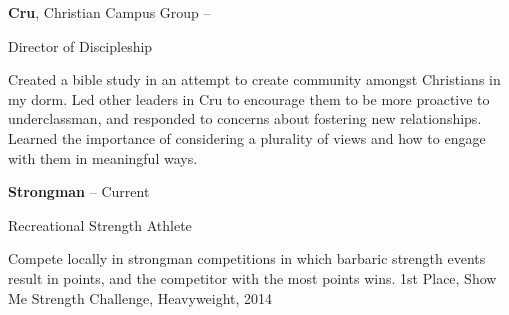 \documentclass[a4paper,10pt,oneside]{article}
\newcommand{\CVNote}{Resume Compiled on May 7}
\begin{document}
\begin{body}
\EntryGap
\textbf{Cru}, Christian Campus Group
\hfill
{} --
\par
Director of Discipleship
\begin{detail}
\BulletItem
Created a bible study in an attempt to create community amongst Christians in my dorm.
\BulletItem
Led other leaders in Cru to encourage them to be more proactive to underclassman, and responded to concerns about fostering new relationships.
\BulletItem
Learned the importance of considering a plurality of views and how to engage with them in meaningful ways.
\end{detail}

\EntryGap
\textbf{Strongman}
\hfill
{} -- Current
\par
Recreational Strength Athlete
\begin{detail}
\BulletItem
Compete locally in strongman competitions in which barbaric strength events result in points, and the competitor with the most points wins.
\BulletItem
1st Place, Show Me Strength Challenge, Heavyweight, 2014
\end{detail}




\end{body}



\end{document}
